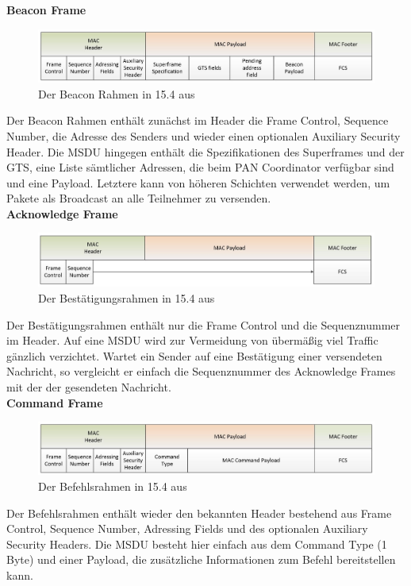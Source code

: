 \textbf{Beacon Frame} \\
\begin{figure}
	\centering
	\includegraphics[width=\textwidth]{Grafiken-Alex/beaconframe.jpg}
	\caption{Der Beacon Rahmen in 15.4 aus \cite{bartusch}}
	\label{beaconframe}
\end{figure}
Der Beacon Rahmen enthält zunächst im Header die Frame Control, Sequence Number, die Adresse des Senders und wieder einen optionalen Auxiliary Security Header. Die MSDU hingegen enthält die Spezifikationen des Superframes und der GTS, eine Liste sämtlicher Adressen, die beim PAN Coordinator verfügbar sind und eine Payload. Letztere kann von höheren Schichten verwendet werden, um Pakete als Broadcast an alle Teilnehmer zu versenden. \\

\textbf{Acknowledge Frame} \\
\begin{figure}
	\centering
	\includegraphics[width=\textwidth]{Grafiken-Alex/acknowledgeframe.jpg}
	\caption{Der Bestätigungsrahmen in 15.4 aus \cite{bartusch}}
	\label{acknowledgeframe}
\end{figure}
Der Bestätigungsrahmen enthält nur die Frame Control und die Sequenznummer im Header. Auf eine MSDU wird zur Vermeidung von übermäßig viel Traffic gänzlich verzichtet. Wartet ein Sender auf eine Bestätigung einer versendeten Nachricht, so vergleicht er einfach die Sequenznummer des Acknowledge Frames mit der der gesendeten Nachricht. \\

\textbf{Command Frame} \\
\begin{figure}
	\centering
	\includegraphics[width=\textwidth]{Grafiken-Alex/commandframe.jpg}
	\caption{Der Befehlsrahmen in 15.4 aus \cite{bartusch}}
	\label{commandframe}
\end{figure}
Der Befehlsrahmen enthält wieder den bekannten Header bestehend aus Frame Control, Sequence Number, Adressing Fields und des optionalen Auxiliary Security Headers. Die MSDU besteht hier einfach aus dem Command Type (1 Byte) und einer Payload, die zusätzliche Informationen zum Befehl bereitstellen kann.




